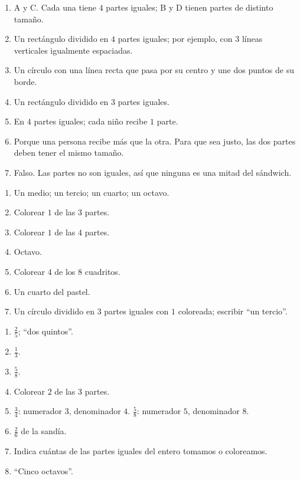 \begin{enumerate}
\item A y C. Cada una tiene $4$ partes iguales; B y D tienen partes de distinto tamaño.
\item Un rectángulo dividido en $4$ partes iguales; por ejemplo, con $3$ líneas verticales igualmente espaciadas.
\item Un círculo con una línea recta que pasa por su centro y une dos puntos de su borde.
\item Un rectángulo dividido en $3$ partes iguales.
\item En $4$ partes iguales; cada niño recibe $1$ parte.
\item Porque una persona recibe más que la otra. Para que sea justo, las dos partes deben tener el mismo tamaño.
\item Falso. Las partes no son iguales, así que ninguna es una mitad del sándwich.
\end{enumerate}

\begin{enumerate}
\item Un medio; un tercio; un cuarto; un octavo.
\item Colorear $1$ de las $3$ partes.
\item Colorear $1$ de las $4$ partes.
\item Octavo.
\item Colorear $4$ de los $8$ cuadritos.
\item Un cuarto del pastel.
\item Un círculo dividido en $3$ partes iguales con $1$ coloreada; escribir ``un tercio''.
\end{enumerate}

\begin{enumerate}
\item $\frac{2}{5}$; ``dos quintos''.
\item $\frac{1}{3}$.
\item $\frac{5}{8}$.
\item Colorear $2$ de las $3$ partes.
\item $\frac{3}{4}$: numerador $3$, denominador $4$. $\frac{5}{8}$: numerador $5$, denominador $8$.
\item $\frac{2}{6}$ de la sandía.
\item Indica cuántas de las partes iguales del entero tomamos o coloreamos.
\item ``Cinco octavos''.
\end{enumerate}

